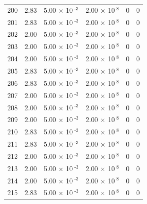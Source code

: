 \documentclass[a4paper,11pt]{article}
\begin{document}
\begin{center}
\begin{longtable}{|R{1.5cm}|R{2.4cm}|R{2.4cm}|R{2.4cm}|R{2.4cm}|R{2.4cm}|}
  200 &   2.83  &         5.00 $\times$ 10$^{\text{          -3}}$  &         2.00 $\times$ 10$^{\text{           8}}$  & 0  & 0 \\
  201 &   2.83  &         5.00 $\times$ 10$^{\text{          -3}}$  &         2.00 $\times$ 10$^{\text{           8}}$  & 0  & 0 \\
  202 &   2.00  &         5.00 $\times$ 10$^{\text{          -3}}$  &         2.00 $\times$ 10$^{\text{           8}}$  & 0  & 0 \\
  203 &   2.00  &         5.00 $\times$ 10$^{\text{          -3}}$  &         2.00 $\times$ 10$^{\text{           8}}$  & 0  & 0 \\
  204 &   2.00  &         5.00 $\times$ 10$^{\text{          -3}}$  &         2.00 $\times$ 10$^{\text{           8}}$  & 0  & 0 \\
  205 &   2.83  &         5.00 $\times$ 10$^{\text{          -3}}$  &         2.00 $\times$ 10$^{\text{           8}}$  & 0  & 0 \\
  206 &   2.83  &         5.00 $\times$ 10$^{\text{          -3}}$  &         2.00 $\times$ 10$^{\text{           8}}$  & 0  & 0 \\
  207 &   2.00  &         5.00 $\times$ 10$^{\text{          -3}}$  &         2.00 $\times$ 10$^{\text{           8}}$  & 0  & 0 \\
  208 &   2.00  &         5.00 $\times$ 10$^{\text{          -3}}$  &         2.00 $\times$ 10$^{\text{           8}}$  & 0  & 0 \\
  209 &   2.00  &         5.00 $\times$ 10$^{\text{          -3}}$  &         2.00 $\times$ 10$^{\text{           8}}$  & 0  & 0 \\
  210 &   2.83  &         5.00 $\times$ 10$^{\text{          -3}}$  &         2.00 $\times$ 10$^{\text{           8}}$  & 0  & 0 \\
  211 &   2.83  &         5.00 $\times$ 10$^{\text{          -3}}$  &         2.00 $\times$ 10$^{\text{           8}}$  & 0  & 0 \\
  212 &   2.00  &         5.00 $\times$ 10$^{\text{          -3}}$  &         2.00 $\times$ 10$^{\text{           8}}$  & 0  & 0 \\
  213 &   2.00  &         5.00 $\times$ 10$^{\text{          -3}}$  &         2.00 $\times$ 10$^{\text{           8}}$  & 0  & 0 \\
  214 &   2.00  &         5.00 $\times$ 10$^{\text{          -3}}$  &         2.00 $\times$ 10$^{\text{           8}}$  & 0  & 0 \\
  215 &   2.83  &         5.00 $\times$ 10$^{\text{          -3}}$  &         2.00 $\times$ 10$^{\text{           8}}$  & 0  & 0 \\

\end{longtable}
\end{center}
\end{document}
